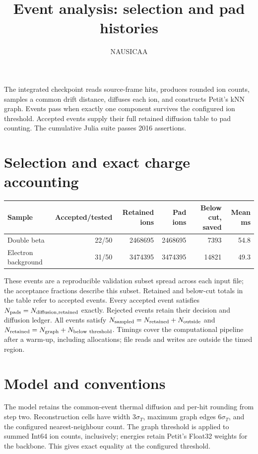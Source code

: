 \documentclass[11pt]{article}
\begin{document}
\title{Event analysis: selection and pad histories}
\author{NAUSICAA}\date{}\maketitle
The integrated checkpoint reads source-frame hits, produces rounded ion counts,
samples a common drift distance, diffuses each ion, and constructs Petit's kNN
graph. Events pass when exactly one component survives the configured ion
threshold. Accepted events supply their full retained diffusion table to pad
counting. The cumulative Julia suite passes 2016 assertions.

\section*{Selection and exact charge accounting}
\begin{center}\small\setlength{\tabcolsep}{4pt}
\begin{tabular}{lrrrrr}\toprule
Sample & Accepted/tested & Retained ions & Pad ions & Below cut, saved & Mean ms \\\midrule
Double beta & 22/50 & 2468695 & 2468695 & 7393 & 54.8 \\
Electron background & 31/50 & 3474395 & 3474395 & 14821 & 49.3 \\
\bottomrule\end{tabular}\end{center}
These events are a reproducible validation subset spread across each input file;
the acceptance fractions describe this subset. Retained and below-cut totals in
the table refer to accepted events. Every accepted event satisfies
$N_{\rm pads}=N_{\rm diffusion,retained}$ exactly. Rejected events retain their
decision and diffusion ledger. All events satisfy
$N_{\rm sampled}=N_{\rm retained}+N_{\rm outside}$ and
$N_{\rm retained}=N_{\rm graph}+N_{\rm below\ threshold}$.
Timings cover the computational pipeline after a warm-up, including allocations;
file reads and writes are outside the timed region.

\section*{Model and conventions}
The model retains the common-event thermal diffusion and per-hit rounding from
step two. Reconstruction cells have width $3\sigma_T$, maximum graph edges
$6\sigma_T$, and the configured nearest-neighbour count. The graph threshold is
applied to summed Int64 ion counts, inclusively; energies retain Petit's Float32
weights for the backbone. This gives exact equality at the configured threshold.
\end{document}
